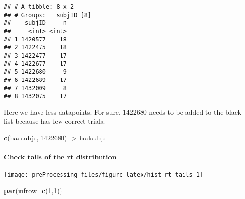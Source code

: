 \documentclass[
]{article}
\newenvironment{Shaded}{\begin{snugshade}}{\end{snugshade}}
\newcommand{\DataTypeTok}[1]{\textcolor[rgb]{0.13,0.29,0.53}{#1}}
\newcommand{\DecValTok}[1]{\textcolor[rgb]{0.00,0.00,0.81}{#1}}
\newcommand{\KeywordTok}[1]{\textcolor[rgb]{0.13,0.29,0.53}{\textbf{#1}}}
\newcommand{\NormalTok}[1]{#1}
\newcommand{\OperatorTok}[1]{\textcolor[rgb]{0.81,0.36,0.00}{\textbf{#1}}}
\newcommand{\StringTok}[1]{\textcolor[rgb]{0.31,0.60,0.02}{#1}}
\begin{document}
\begin{verbatim}
## # A tibble: 8 x 2
## # Groups:   subjID [8]
##    subjID     n
##     <int> <int>
## 1 1420577    18
## 2 1422475    18
## 3 1422477    17
## 4 1422677    17
## 5 1422680     9
## 6 1422689    17
## 7 1432009     8
## 8 1432075    17
\end{verbatim}

Here we have less datapoints. For sure, 1422680 needs to be added to the
black list because has few correct trials.

\begin{Shaded}
\begin{Highlighting}[]
\KeywordTok{c}\NormalTok{(badsubjs, }\DecValTok{1422680}\NormalTok{) ->}\StringTok{ }\NormalTok{badsubjs}
\end{Highlighting}
\end{Shaded}

\hypertarget{check-tails-of-the-rt-distribution-1}{%
\paragraph{Check tails of the rt
distribution}\label{check-tails-of-the-rt-distribution-1}}

\begin{Shaded}
\end{Shaded}

\begin{center}\texttt{[image: preProcessing\_files/figure-latex/hist rt tails-1]} \end{center}

\begin{Shaded}
\begin{Highlighting}[]
\KeywordTok{par}\NormalTok{(}\DataTypeTok{mfrow=}\KeywordTok{c}\NormalTok{(}\DecValTok{1}\NormalTok{,}\DecValTok{1}\NormalTok{))}
\end{Highlighting}
\end{Shaded}
\end{document}
